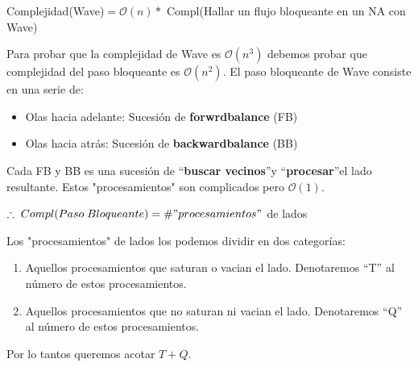 \documentclass[12pt,a4paper]{report}
\begin{document}
		\begin{center}
			Complejidad(Wave)$ = \mathcal{O}(n) *$ Compl(Hallar un flujo bloqueante en un NA con Wave)
		\end{center}
		
		Para probar que la complejidad de Wave es $\mathcal{O}(n^{3})$ debemos probar que complejidad del paso bloqueante es $\mathcal{O}(n^{2})$. El paso bloqueante de Wave consiste en una serie de:
		
		\begin{itemize}
			\item Olas hacia adelante: Sucesión de \textbf{forwrdbalance} (FB)
			\item Olas hacia atrás: Sucesión de \textbf{backwardbalance} (BB)
		\end{itemize}
		
		Cada FB y BB es una sucesión de \textquotedblleft \textbf{buscar vecinos}\textquotedblright y \textquotedblleft \textbf{procesar}\textquotedblright el lado resultante. Estos "procesamientos" \; son complicados pero $ \mathcal{O}(1)$.
		
		\begin{center}
		$ \therefore \; Compl(Paso \; Bloqueante) = \# "procesamientos"$ de lados
		\end{center}
	
		Los "procesamientos" \; de lados los podemos dividir en dos categorías:
		\begin{enumerate}
			\item Aquellos procesamientos que saturan o vacian el lado. Denotaremos \textquotedblleft T\textquotedblright \; al número de estos procesamientos.
			\item Aquellos procesamientos que no saturan ni vacian el lado. Denotaremos \textquotedblleft Q\textquotedblright \; al número de estos procesamientos.
		\end{enumerate}
	
		Por lo tantos queremos acotar $T + Q$.
		
\end{document}
